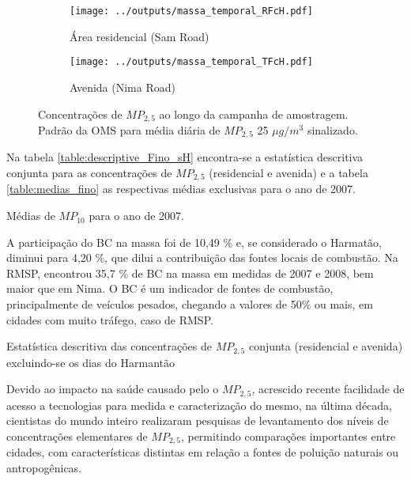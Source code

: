 \begin{figure}[H]
  \centering
  \begin{subfigure}[b]{0.45\textwidth}
    \texttt{[image: ../outputs/massa\_temporal\_RFcH.pdf]}
    \caption{Área residencial (Sam Road)}
  \end{subfigure}%
  \begin{subfigure}[b]{0.45\textwidth}
    \texttt{[image: ../outputs/massa\_temporal\_TFcH.pdf]}
    \caption{Avenida (Nima Road)}
  \end{subfigure}
  \caption{Concentrações de $MP_{2,5}$ ao longo da campanha de amostragem. 
           Padrão da OMS para média diária de $MP_{2,5}$ 25 $\mu g/m^3$ sinalizado.
           \label{fig:massa_temporal_mp2.5}}
\end{figure}

Na tabela \ref{table:descriptive_Fino_sH} encontra-se a estatística 
descritiva conjunta para as concentrações de $MP_{2,5}$ (residencial e avenida)
e a tabela \ref{table:medias_fino} as respectivas médias exclusivas para o ano
de 2007.

\begin{table}[H]
  \centering
  \caption{Médias de $MP_{10}$ para o ano de 2007. \label{table:medias_fino}}
  
\end{table} 

A participação do BC na massa foi de 10,49 \% e, se considerado 
o Harmatão, diminui para 4,20 \%, que dilui a contribuição das fontes locais 
de combustão.
Na RMSP, \citet{andrade2012} encontrou 35,7 \% de BC na massa em medidas
de 2007 e 2008, bem maior que em Nima. O BC é um indicador de fontes de 
combustão, principalmente de veículos pesados, chegando a valores de 50\% ou 
mais, em cidades com muito tráfego, caso de RMSP.

\begin{table}[H]
  \centering
  \caption{Estatística descritiva das concentrações de $MP_{2,5}$ conjunta 
           (residencial e avenida) excluindo-se os dias do Harmantão
            \label{table:descriptive_Fino_sH}}
    
\end{table}

Devido ao impacto na saúde causado pelo o $MP_{2,5}$, acrescido recente facilidade 
 de acesso a tecnologias para medida e caracterização do mesmo, 
na última década, cientistas do mundo inteiro realizaram pesquisas de 
levantamento dos níveis de concentrações elementares de $MP_{2,5}$, permitindo
comparações importantes entre cidades, com características distintas em 
relação a fontes de poluição naturais ou antropogênicas.

